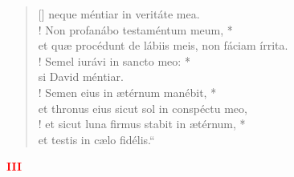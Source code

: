 \begin{verse}[\versewidth]
neque méntiar in veritáte mea.\\!
\vin Non profanábo testaméntum meum, *\\
\vin et quæ procédunt de lábiis meis, non fáciam írrita.\\!
Semel iurávi in sancto meo: *\\
si David méntiar.\\!
\vin Semen eius in ætérnum manébit, *\\
\vin et thronus eius sicut sol in conspéctu meo,\\!
et sicut luna firmus stabit in ætérnum, *\\
et testis in cælo fidélis.“\\
\end{verse}
\begin{center}
\textcolor{red}{\bf III}
\end{center}
